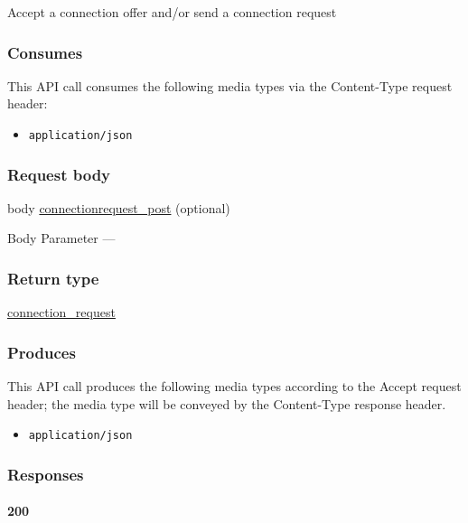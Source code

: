 Accept a connection offer and/or send a connection request

\hypertarget{consumes-36}{%
\subsubsection{Consumes}\label{consumes-36}}

This API call consumes the following media types via the {Content-Type}
request header:

\begin{itemize}
\tightlist
\item
  \texttt{application/json}
\end{itemize}

\hypertarget{request-body-36}{%
\subsubsection{Request body}\label{request-body-36}}

body \protect\hyperlink{connectionrequest_post}{connectionrequest\_post}
(optional)

{Body Parameter} ---

\hypertarget{return-type-87}{%
\subsubsection{Return type}\label{return-type-87}}

\protect\hyperlink{connection_request}{connection\_request}

\hypertarget{produces-112}{%
\subsubsection{Produces}\label{produces-112}}

This API call produces the following media types according to the
{Accept} request header; the media type will be conveyed by the
{Content-Type} response header.

\begin{itemize}
\tightlist
\item
  \texttt{application/json}
\end{itemize}

\hypertarget{responses-115}{%
\subsubsection{Responses}\label{responses-115}}

\hypertarget{section-375}{%
\paragraph{200}\label{section-375}}

